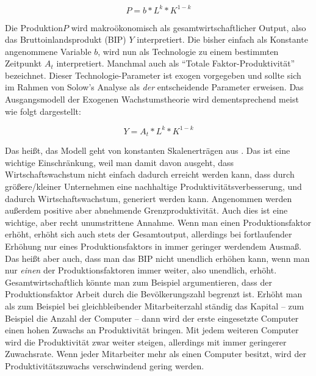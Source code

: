 $$P = b*L^k*K^{1-k}$$

Die Produktion$P$ wird makroökonomisch als gesamtwirtschaftlicher Output, also das Bruttoinlandsprodukt (BIP) $Y$ interpretiert. Die bisher einfach als Konstante angenommene Variable $b$, wird nun als Technologie zu einem bestimmten Zeitpunkt $A_t$ interpretiert. Manchmal auch als "`Totale Faktor-Produktivität"' bezeichnet. Dieser Technologie-Parameter ist exogen vorgegeben und sollte sich im Rahmen von Solow's Analyse als \textit{der} entscheidende Parameter erweisen. Das Ausgangsmodell der Exogenen Wachstumstheorie wird dementsprechend meist wie folgt dargestellt:

$$Y = A_t*L^k*K^{1-k}$$

Das heißt, das Modell geht von konstanten Skalenerträgen aus \parencite[S. 67]{Solow1956}. Das ist eine wichtige Einschränkung, weil man damit davon ausgeht, dass Wirtschaftswachstum nicht einfach dadurch erreicht werden kann, dass durch größere/kleiner Unternehmen eine nachhaltige Produktivitätsverbesserung, und dadurch Wirtschaftswachstum, generiert werden kann. Angenommen werden außerdem positive aber abnehmende Grenzproduktivität. Auch dies ist eine wichtige, aber recht unumstrittene Annahme. Wenn man einen Produktionsfaktor erhöht, erhöht sich auch stets der Gesamtoutput, allerdings bei fortlaufender Erhöhung nur eines Produktionsfaktors in immer geringer werdendem Ausmaß. Das heißt aber auch, dass man das BIP nicht unendlich erhöhen kann, wenn man nur \textit{einen} der Produktionsfaktoren immer weiter, also unendlich, erhöht. Gesamtwirtschaftlich könnte man zum Beispiel argumentieren, dass der Produktionsfaktor Arbeit durch die Bevölkerungszahl begrenzt ist. Erhöht man als zum Beispiel bei gleichbleibender Mitarbeiterzahl ständig das Kapital – zum Beispiel die Anzahl der Computer – dann wird der erste eingesetzte Computer einen hohen Zuwachs an Produktivität bringen. Mit jedem weiteren Computer wird die Produktivität zwar weiter steigen, allerdings mit immer geringerer Zuwachsrate. Wenn jeder Mitarbeiter mehr als einen Computer besitzt, wird der Produktivitätszuwachs verschwindend gering werden.

